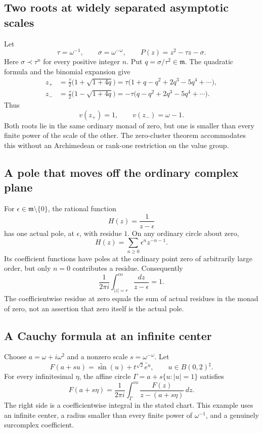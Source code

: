 \documentclass[11pt,a4paper]{article}
\numberwithin{equation}{section}
\theoremstyle{definition}
\theoremstyle{remark}
\newcommand{\mm}{\mathfrak m}
\newcommand{\co}{\mathrm{co}}
\begin{document}
\subsection{Two roots at widely separated asymptotic scales}
Let
\[
 \tau=\omega^{-1},\qquad \sigma=\omega^{-\omega},\qquad
 P(z)=z^2-\tau z-\sigma.
\]
Here $\sigma\prec\tau^n$ for every positive integer $n$. Put $q=\sigma/\tau^2\in\mm$. The quadratic formula and the binomial expansion give
\begin{align*}
 z_+&=\frac\tau2\bigl(1+\sqrt{1+4q}\bigr)
     =\tau\bigl(1+q-q^2+2q^3-5q^4+\cdots\bigr),\\
 z_-&=\frac\tau2\bigl(1-\sqrt{1+4q}\bigr)
     =-\tau\bigl(q-q^2+2q^3-5q^4+\cdots\bigr).
\end{align*}
Thus
\[
 v(z_+)=1,\qquad v(z_-)=\omega-1.
\]
Both roots lie in the same ordinary monad of zero, but one is smaller than every finite power of the scale of the other. The zero-cluster theorem accommodates this without an Archimedean or rank-one restriction on the value group.

\subsection{A pole that moves off the ordinary complex plane}
For $\epsilon\in\mm\setminus\{0\}$, the rational function
\[
 H(z)=\frac1{z-\epsilon}
\]
has one actual pole, at $\epsilon$, with residue $1$. On any ordinary circle about zero,
\[
 H(z)=\sum_{n\geq0}\epsilon^n z^{-n-1}.
\]
Its coefficient functions have poles at the ordinary point zero of arbitrarily large order, but only $n=0$ contributes a residue. Consequently
\[
 \frac1{2\pi i}\int_{|z|=r}^{\co}\frac{dz}{z-\epsilon}=1.
\]
The coefficientwise residue at zero equals the sum of actual residues in the monad of zero, not an assertion that zero itself is the actual pole.

\subsection{A Cauchy formula at an infinite center}
Choose $a=\omega+i\omega^2$ and a nonzero scale $s=\omega^{-\omega}$. Let
\[
 F(a+su)=\widetilde{\sin}(u)+t^{\sqrt2}\widetilde{e^u},
 \qquad u\in B(0,2)^\sharp.
\]
For every infinitesimal $\eta$, the affine circle $\Gamma=a+s\{u:|u|=1\}$ satisfies
\[
 F(a+s\eta)=\frac1{2\pi i}\int_\Gamma^{\co}
                 \frac{F(z)}{z-(a+s\eta)}\,dz.
\]
The right side is a coefficientwise integral in the stated chart. This example uses an infinite center, a radius smaller than every finite power of $\omega^{-1}$, and a genuinely surcomplex coefficient.
\end{document}
